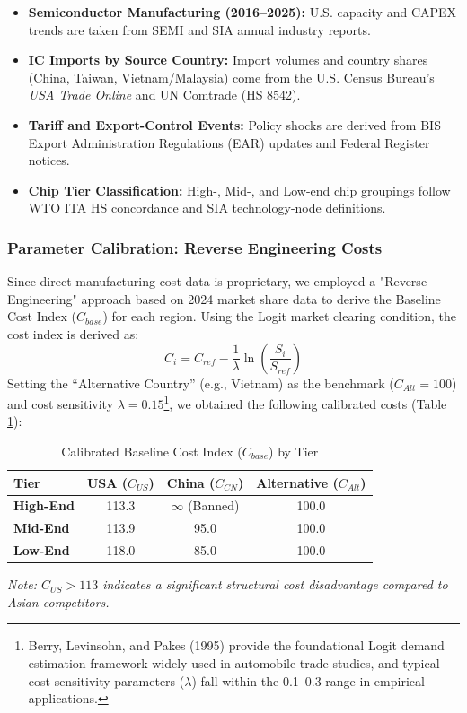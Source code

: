 \documentclass{apmcmthesis}
\begin{document}
\begin{itemize}
    \item \textbf{Semiconductor Manufacturing (2016--2025):}
    U.S. capacity and CAPEX trends are taken from SEMI and SIA annual industry reports.

    \item \textbf{IC Imports by Source Country:}
    Import volumes and country shares (China, Taiwan, Vietnam/Malaysia) come from 
    the U.S. Census Bureau’s \textit{USA Trade Online} and UN Comtrade (HS 8542).

    \item \textbf{Tariff and Export-Control Events:}
    Policy shocks are derived from BIS Export Administration Regulations (EAR) updates and Federal Register notices.

    \item \textbf{Chip Tier Classification:}
    High-, Mid-, and Low-end chip groupings follow WTO ITA HS concordance and SIA technology-node definitions.
\end{itemize}



\subsubsection{Parameter Calibration: Reverse Engineering Costs}
Since direct manufacturing cost data is proprietary, we employed a "Reverse Engineering" approach based on 2024 market share data to derive the Baseline Cost Index ($C_{base}$) for each region.
Using the Logit market clearing condition, the cost index is derived as:
\begin{equation}
    C_i = C_{ref} - \frac{1}{\lambda} \ln \left( \frac{S_i}{S_{ref}} \right)
\end{equation}
Setting the ``Alternative Country'' (e.g., Vietnam) as the benchmark ($C_{Alt} = 100$) and cost sensitivity $\lambda = 0.15$\footnote{\cite{BLP1995} Berry, Levinsohn, and Pakes (1995) provide the foundational Logit demand estimation framework widely used in automobile trade studies, and typical cost-sensitivity parameters ($\lambda$) fall within the 0.1--0.3 range in empirical applications.}, we obtained the following calibrated costs (Table \ref{tab:cost_calibration}):


\begin{table}[htbp]
    \centering
    \caption{Calibrated Baseline Cost Index ($C_{base}$) by Tier}
    \begin{tabular}{lccc}
        \toprule
        \textbf{Tier} & \textbf{USA ($C_{US}$)} & \textbf{China ($C_{CN}$)} & \textbf{Alternative ($C_{Alt}$)} \\
        \midrule
        \textbf{High-End} & 113.3 & $\infty$ (Banned) & 100.0 \\
        \textbf{Mid-End}  & 113.9 & 95.0 & 100.0 \\
        \textbf{Low-End}  & 118.0 & 85.0 & 100.0 \\
        \bottomrule
    \end{tabular}
    \label{tab:cost_calibration}
\end{table}
\textit{Note: $C_{US} > 113$ indicates a significant structural cost disadvantage compared to Asian competitors.}
\end{document}
